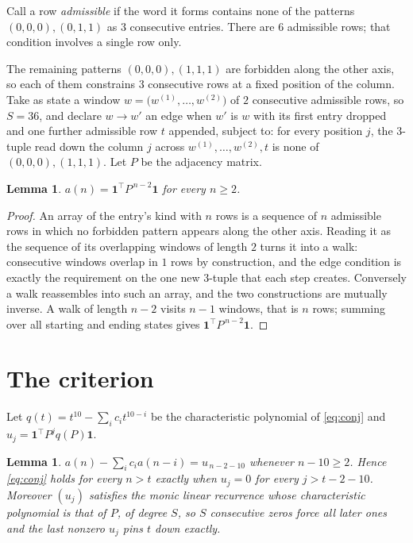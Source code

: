 \documentclass[11pt,a4paper]{article}
\theoremstyle{plain}
\newtheorem{lemma}[theorem]{Lemma}
\theoremstyle{definition}
\begin{document}
Call a row \emph{admissible} if the word it forms contains none of the patterns
$(0,0,0), (0,1,1)$ as $3$ consecutive entries. There are $6$ admissible rows; that condition
involves a single row only.

The remaining patterns $(0,0,0), (1,1,1)$ are forbidden along the other axis, so each of them
constrains $3$ consecutive rows at a fixed position of the column. Take as state a
window $w=\bigl(w^{(1)},\dots,w^{(2)}\bigr)$ of $2$ consecutive admissible
rows, so $S=36$, and declare $w\to w'$ an edge when $w'$ is $w$ with its first entry
dropped and one further admissible row $t$ appended, subject to: for every position
$j$, the $3$-tuple read down the column $j$ across $w^{(1)},\dots,w^{(2)},t$
is none of $(0,0,0), (1,1,1)$. Let $P$ be the adjacency matrix.

\begin{lemma}\label{lem:walk}
$a(n)=\mathbf{1}^{\!\top}P^{\,n-2}\mathbf{1}$ for every $n\ge2$.
\end{lemma}

\begin{proof}
An array of the entry's kind with $n$ rows is a sequence of $n$ admissible rows in
which no forbidden pattern appears along the other axis. Reading it as the sequence of its
overlapping windows of length $2$ turns it into a walk: consecutive windows overlap in
$1$ rows by construction, and the edge condition is exactly the requirement on the one
new $3$-tuple that each step creates. Conversely a walk reassembles into such an array,
and the two constructions are mutually inverse. A walk of length $n-2$ visits $n-1$
windows, that is $n$ rows; summing over all starting and ending states gives
$\mathbf{1}^{\!\top}P^{\,n-2}\mathbf{1}$.
\end{proof}

\section{The criterion}

Let $q(t)=t^{10}-\sum_i c_i t^{10-i}$ be the characteristic polynomial of
\eqref{eq:conj} and $u_j=\mathbf{1}^{\!\top}P^{j}q(P)\mathbf{1}$.

\begin{lemma}\label{lem:crit}
$a(n)-\sum_i c_i a(n-i)=u_{\,n-2-10}$ whenever $n-10\ge2$. Hence
\eqref{eq:conj} holds for every $n>t$ exactly when $u_j=0$ for every
$j>t-2-10$. Moreover $(u_j)$ satisfies the monic linear recurrence whose
characteristic polynomial is that of $P$, of degree $S$, so $S$ consecutive zeros force all
later ones and the last nonzero $u_j$ pins $t$ down exactly.
\end{lemma}
\end{document}
